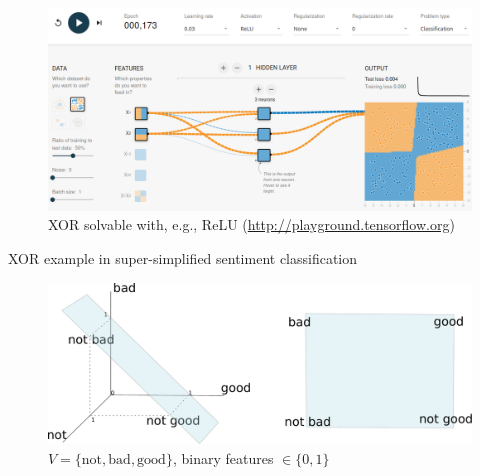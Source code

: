 \documentclass[12pt,aspectratio=169,handout]{beamer}
\begin{document}
\begin{frame}
	\begin{figure}
		\vspace{-1.3em}
		\includegraphics[width=1.35\linewidth]{img/linear4.png}	
		\caption{XOR solvable with, e.g., ReLU (\url{http://playground.tensorflow.org})}
	\end{figure}	
\end{frame}


\begin{frame}{XOR example in super-simplified sentiment classification}
	\begin{figure}
		\vspace{-1.3em}
		\includegraphics[width=1.2\linewidth]{img/xor1.pdf}	
		\caption{$V = \{\text{not}, \text{bad}, \text{good}\}$, binary features $\in \{0, 1\}$}
	\end{figure}	
\end{frame}
\end{document}
